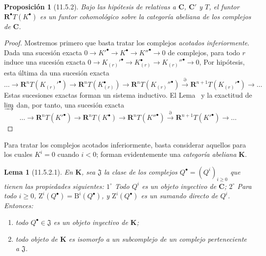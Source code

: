 \documentclass[10pt,oneside,openany]{book}
\theoremstyle{egaenv}\newtheorem*{env}{---}
\theoremstyle{egastatement}
\newtheorem*{proposition}{Proposición}
\newtheorem*{lemma}{Lema}
\theoremstyle{egadescription}
\newcommand{\oldpage}[2][]{\marginnote{\normalfont\scriptsize\textbf{#1}\,|\,#2}\ignorespaces}
\renewcommand{\geq}{\geqslant}
\begin{document}
\begin{proposition}[11.5.2]
\label{0.11.5.2}
\label{0.11.5.2-fr}
Bajo las hipótesis de  relativas a $\boldsymbol{C}$, $\boldsymbol{C}'$ y $T$, el funtor $\mathbf R^\bullet T(K^\bullet)$ es un funtor cohomológico sobre la categoría abeliana de los complejos de $\boldsymbol{C}$.
\end{proposition}

\begin{proof}
Mostremos primero que basta tratar los complejos \emph{acotados inferiormente}.
Dada una sucesión exacta
$0\longrightarrow K'^\bullet\longrightarrow K^\bullet\longrightarrow K''^\bullet\longrightarrow0$
de complejos, para todo $r$ induce una sucesión exacta
$0\longrightarrow K_{(r)}'^\bullet\longrightarrow K_{(r)}^\bullet\longrightarrow K_{(r)}''^\bullet\longrightarrow0$,
Por hipótesis, esta última da una sucesión exacta
\[
  \ldots\longrightarrow\mathbf R^nT(K_{(r)}'^\bullet)
  \longrightarrow\mathbf R^nT(K_{(r)}^\bullet)
  \longrightarrow\mathbf R^nT(K_{(r)}''^\bullet)
  \xrightarrow{\partial}\mathbf R^{n+1}T(K_{(r)}'^\bullet)
  \longrightarrow\ldots
\]
Estas sucesiones exactas forman un sistema inductivo.
El Lema~ y la exactitud de $\varinjlim$ dan, por tanto, una sucesión exacta
\[
  \ldots\longrightarrow\mathbf R^nT(K'^\bullet)
  \longrightarrow\mathbf R^nT(K^\bullet)
  \longrightarrow\mathbf R^nT(K''^\bullet)
  \xrightarrow{\partial}\mathbf R^{n+1}T(K'^\bullet)
  \longrightarrow\ldots
\]
\end{proof}

Para tratar los complejos acotados inferiormente, basta considerar aquellos para los cuales $K^i=0$ cuando $i<0$; forman evidentemente una \emph{categoría abeliana} $\boldsymbol{K}$.

\begin{lemma}[11.5.2.1]
\label{0.11.5.2.1}
\label{0.11.5.2.1-fr}
En $\boldsymbol{K}$, sea $\mathfrak J$ la clase de los complejos $Q^\bullet=(Q^i)_{i\geq0}$ que tienen las
\oldpage[0\textsubscript{III}]{37}
propiedades siguientes: $1^\circ$ Todo $Q^i$ es un objeto inyectivo de $\boldsymbol{C}$; $2^\circ$ Para todo $i\geq0$, $\mathrm Z^i(Q^\bullet)=\mathrm B^i(Q^\bullet)$, y $\mathrm Z^i(Q^\bullet)$ es un sumando directo de $Q^i$.
Entonces:
\begin{enumerate}
  \item[{\rm(i)}] todo $Q^\bullet\in\mathfrak J$ es un objeto inyectivo de $\boldsymbol{K}$;
  \item[{\rm(ii)}] todo objeto de $\boldsymbol{K}$ es isomorfo a un subcomplejo de un complejo perteneciente a $\mathfrak J$.
\end{enumerate}
\end{lemma}
\end{document}
